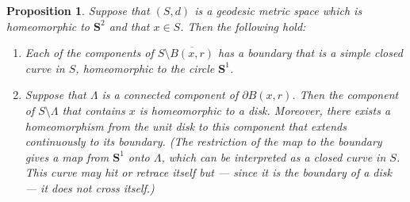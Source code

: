 \documentclass[10pt]{amsart}
\theoremstyle{plain}
\numberwithin{theorem}{section}
\newtheorem{proposition}[theorem]{Proposition}
\theoremstyle{definition}
\renewcommand{\S}{{\mathbf S}}
\let\ol\overline
\begin{document}
\begin{proposition}
\label{prop::boundariesarecircles}
Suppose that $(S, d)$ is a geodesic metric space which is homeomorphic to $\S^2$ and that $x \in S$. Then the following hold:
\begin{enumerate}
\item Each of the components of $S \setminus \ol{B(x,r)}$ has a boundary that is a simple closed curve in $S$, homeomorphic to the circle $\S^1$.
\item Suppose that $\Lambda$ is a connected component of $\partial B(x,r)$. Then the component of \hbox{$S \setminus \Lambda$} that contains $x$ is homeomorphic to a disk. Moreover, there exists a homeomorphism from the unit disk to this component that extends continuously to its boundary. (The restriction of the map to the boundary gives a map from $\S^1$ onto $\Lambda$, which can be interpreted as a closed curve in $S$. This curve may hit or retrace itself but --- since it is the boundary of a disk --- it does not cross itself.)
\end{enumerate}

\end{proposition}
\end{document}
